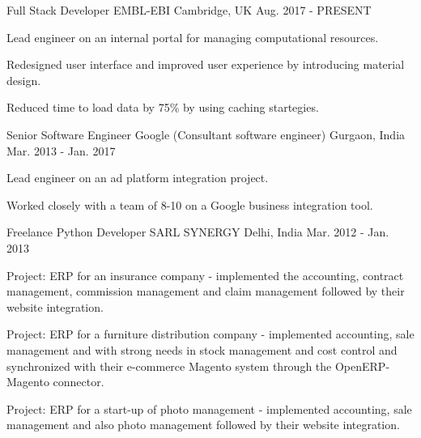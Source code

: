 

\begin{cventries}

  \cventry
    {Full Stack Developer} %
    {EMBL-EBI} %
    {Cambridge, UK} %
    {Aug. 2017 - PRESENT} %
    {
      \begin{cvitems} %
        \item {Lead engineer on an internal portal for managing computational resources.}
        \item {Redesigned user interface and improved user experience by introducing material design.}
        \item {Reduced time to load data by 75\% by using caching startegies.}
      \end{cvitems}
    }

  \cventry
    {Senior Software Engineer} %
    {Google (Consultant software engineer)} %
    {Gurgaon, India} %
    {Mar. 2013 - Jan. 2017} %
    {
      \begin{cvitems} %
        \item {Lead engineer on an ad platform integration project.}
        \item {Worked closely with a team of 8-10 on a Google business integration tool.}
      \end{cvitems}
    }

  \cventry
    {Freelance Python Developer} %
    {SARL SYNERGY} %
    {Delhi, India} %
    {Mar. 2012 - Jan. 2013} %
    {
      \begin{cvitems} %
        \item {Project: ERP for an insurance company - implemented the accounting, contract management, commission management and claim management followed by their website integration.}
        \item {Project: ERP for a furniture distribution company - implemented accounting, sale management and with strong needs in stock management and cost control and synchronized with their e-commerce Magento system through the OpenERP-Magento connector.}
        \item {Project: ERP for a start-up of photo management - implemented accounting, sale management and also photo management followed by their website integration.}
      \end{cvitems}
    }


\end{cventries}
